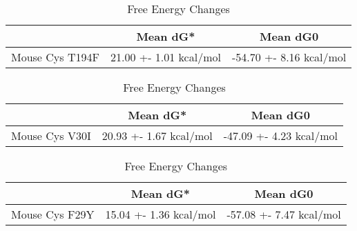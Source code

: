                             \begin{table}[ht]
                              \centering
                              \begin{tabular}{|c|c|c|}
                              \hline
                                & Mean dG* & Mean dG0 \\
                              \hline
                  Mouse Cys T194F & 21.00 +- 1.01 kcal/mol & -54.70 +- 8.16 kcal/mol \\
                              \hline
                              \end{tabular}
                              \caption{Free Energy Changes}
                              \end{table}
                          
      
                              \begin{table}[ht]
                                \centering
                                \begin{tabular}{|c|c|c|}
                                \hline
                                  & Mean dG* & Mean dG0 \\
                                \hline
                   Mouse Cys V30I & 20.93 +- 1.67 kcal/mol & -47.09 +- 4.23 kcal/mol \\
                                \hline
                                \end{tabular}
                                \caption{Free Energy Changes}
                                \end{table}


                                \begin{table}[ht]
                                  \centering
                                  \begin{tabular}{|c|c|c|}
                                  \hline
                                    & Mean dG* & Mean dG0 \\
                                  \hline
                  Mouse Cys F29Y & 15.04 +- 1.36 kcal/mol & -57.08 +- 7.47 kcal/mol \\
                                  \hline
                                  \end{tabular}
                                  \caption{Free Energy Changes}
                                  \end{table}
                                  


